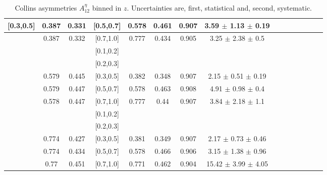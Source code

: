 \documentclass[aps,prX,preprint,groupedaddress,linenumbers]{revtex4-1}
\begin{document}
\begin{table}[H]
\begin{tabular}{|c| c| c| c| c| c| c| c| c| c|c| c| c| c| c|}
[0.3,0.5]	&	0.387	&	0.331	&	[0.5,0.7]	&	0.578	&	0.461	&	0.907	&	3.59  $\pm$ 1.13  $\pm$ 0.19    \\ \hline
[0.3,0.5]	&	0.387	&	0.332	&	[0.7,1.0]	&	0.777	&	0.434	&	0.905	&	3.25  $\pm$ 2.38  $\pm$ 0.5  	\\ \hline
\hline
[0.5,0.7]	&		&		&	[0.1,0.2]	&		&		&		&							\\ \hline
[0.5,0.7]	&		&		&	[0.2,0.3]	&		&		&		&							\\ \hline
[0.5,0.7]	&	0.579	&	0.445	&	[0.3,0.5]	&	0.382	&	0.348	&	0.907	&  2.15  $\pm$ 0.51  $\pm$ 0.19  \\ \hline
[0.5,0.7]	&	0.579	&	0.447	&	[0.5,0.7]	&	0.578	&	0.463	&	0.908	&  4.91  $\pm$ 0.98  $\pm$ 0.4   \\ \hline
[0.5,0.7]	&	0.578	&	0.447	&	[0.7,1.0]	&	0.777	&	0.44	&	0.907	&  3.84  $\pm$ 2.18  $\pm$ 1.1   \\ \hline
\hline
[0.7,1.0]	&		&		&	[0.1,0.2]	&		&		&		&							\\ \hline
[0.7,1.0]	&		&		&	[0.2,0.3]	&		&		&		&							\\ \hline
[0.7,1.0]	&	0.774	&	0.427	&	[0.3,0.5]	&	0.381	&	0.349	&	0.907	& 2.17  $\pm$ 0.73  $\pm$ 0.46  	\\ \hline
[0.7,1.0]	&	0.774	&	0.434	&	[0.5,0.7]	&	0.578	&	0.466	&	0.906	& 3.15  $\pm$ 1.38  $\pm$ 0.96     \\ \hline
[0.7,1.0]	&	0.77	&	0.451	&	[0.7,1.0]	&	0.771	&	0.462	&	0.904	& 15.42  $\pm$ 3.99  $\pm$ 4.05    \\ \hline
\end{tabular}
\caption[Collins asymmetries $A_{12}^{\eta}$  binned in $z$]{Collins asymmetries  $A_{12}^{\eta}$ binned in $z$. Uncertainties are, first, statistical and, second, systematic.}
\label{tab:finaletazbin}
\end{table}
\end{document}
